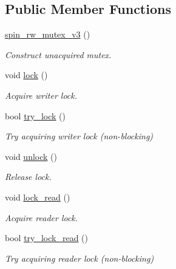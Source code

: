 \subsection*{Public Member Functions}
\begin{DoxyCompactItemize}
\item 
\hypertarget{classtbb_1_1spin__rw__mutex__v3_ad30fc1ffa0a2b8134e177e02c5821d7f}{}\hyperlink{classtbb_1_1spin__rw__mutex__v3_ad30fc1ffa0a2b8134e177e02c5821d7f}{spin\+\_\+rw\+\_\+mutex\+\_\+v3} ()\label{classtbb_1_1spin__rw__mutex__v3_ad30fc1ffa0a2b8134e177e02c5821d7f}

\begin{DoxyCompactList}\small\item\em Construct unacquired mutex. \end{DoxyCompactList}\item 
\hypertarget{classtbb_1_1spin__rw__mutex__v3_a51e207646300a4c242bb4aaa4e04e9b8}{}void \hyperlink{classtbb_1_1spin__rw__mutex__v3_a51e207646300a4c242bb4aaa4e04e9b8}{lock} ()\label{classtbb_1_1spin__rw__mutex__v3_a51e207646300a4c242bb4aaa4e04e9b8}

\begin{DoxyCompactList}\small\item\em Acquire writer lock. \end{DoxyCompactList}\item 
bool \hyperlink{classtbb_1_1spin__rw__mutex__v3_ab6ec20b1ec43a49c8c2908984e35b5e8}{try\+\_\+lock} ()
\begin{DoxyCompactList}\small\item\em Try acquiring writer lock (non-\/blocking) \end{DoxyCompactList}\item 
\hypertarget{classtbb_1_1spin__rw__mutex__v3_ab04321ed2cdf12ac5825c54591028fc0}{}void \hyperlink{classtbb_1_1spin__rw__mutex__v3_ab04321ed2cdf12ac5825c54591028fc0}{unlock} ()\label{classtbb_1_1spin__rw__mutex__v3_ab04321ed2cdf12ac5825c54591028fc0}

\begin{DoxyCompactList}\small\item\em Release lock. \end{DoxyCompactList}\item 
\hypertarget{classtbb_1_1spin__rw__mutex__v3_aa0e3bb644e9021d0f80ee36b03f228e4}{}void \hyperlink{classtbb_1_1spin__rw__mutex__v3_aa0e3bb644e9021d0f80ee36b03f228e4}{lock\+\_\+read} ()\label{classtbb_1_1spin__rw__mutex__v3_aa0e3bb644e9021d0f80ee36b03f228e4}

\begin{DoxyCompactList}\small\item\em Acquire reader lock. \end{DoxyCompactList}\item 
bool \hyperlink{classtbb_1_1spin__rw__mutex__v3_ac932f65b0b66320688e7957ce9c3e2c1}{try\+\_\+lock\+\_\+read} ()
\begin{DoxyCompactList}\small\item\em Try acquiring reader lock (non-\/blocking) \end{DoxyCompactList}\end{DoxyCompactItemize}
